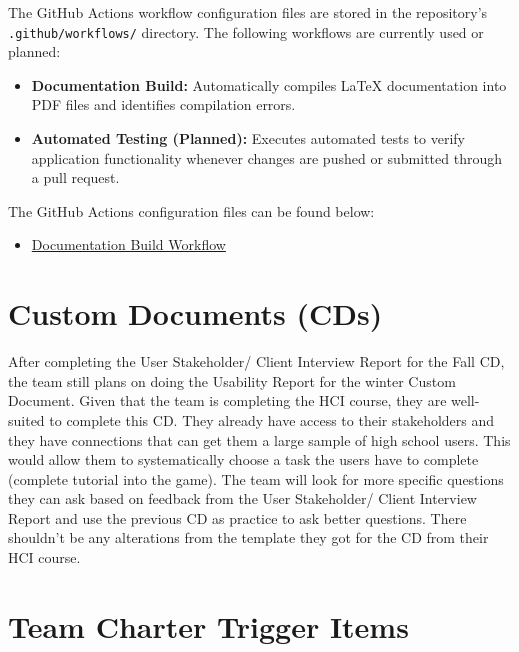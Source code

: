 \documentclass{article}
\begin{document}
The GitHub Actions workflow configuration files are stored in the repository's \texttt{.github/workflows/} directory. The following workflows are currently used or planned:

\begin{itemize}
\item \textbf{Documentation Build:} Automatically compiles LaTeX documentation into PDF files and identifies compilation errors.
\item \textbf{Automated Testing (Planned):} Executes automated tests to verify application functionality whenever changes are pushed or submitted through a pull request.
\end{itemize}

The GitHub Actions configuration files can be found below:

\begin{itemize}
\item \href{https://github.com/Jacob-MB/magic-8/blob/main/.github/workflows/latex-pages.yml}{Documentation Build Workflow}
\end{itemize}

\section{Custom Documents (CDs)}
After completing the User Stakeholder/ Client Interview Report for the Fall CD,
the team still plans on doing the Usability Report for the winter Custom Document.
Given that the team is completing the HCI course, they are well-suited to complete this 
CD. They already have access to their stakeholders and they have connections that can get
them a large sample of high school users. This would allow them to systematically choose
a task the users have to complete (complete tutorial into the game). The team will look for 
more specific questions they can ask based on feedback from the User Stakeholder/ Client Interview Report
and use the previous CD as practice to ask better questions. There shouldn't be any alterations from the template 
they got for the CD from their HCI course.

\section{Team Charter Trigger Items}


\end{document}

